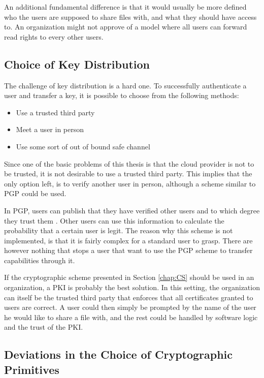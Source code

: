 \documentclass[pdftex,english,10pt,b5paper,twoside]{book}
\begin{document}
An additional fundamental difference is that it would usually be more defined
who the users are supposed to share files with, and what they should have
access to. An organization might not approve of a model where all users can
forward read rights to every other users.

\subsection{Choice of Key Distribution}
\label{sec:DI:keydist}

The challenge of key distribution is a hard one. To successfully authenticate a
user and transfer a key, it is possible to choose from the following methods:

\begin{itemize}
 \item Use a trusted third party
 \item Meet a user in person
 \item Use some sort of out of bound safe channel
\end{itemize}

Since one of the basic problems of this thesis is that the cloud provider is
not to be trusted, it is not desirable to use a trusted third party. This
implies that the only option left, is to verify another user in person,
although a scheme similar to \ac{PGP} could be used. 

In \ac{PGP}, users can publish that they have verified other users and to which
degree they trust them \cite{stallings}. Other users can use this information
to calculate the probability that a certain user is legit. The reason why this
scheme is not implemented, is that it is fairly complex for a standard user to
grasp. There are however nothing that stops a user that want to use the
\ac{PGP} scheme to transfer capabilities through it.

If the cryptographic scheme presented in Section \ref{chap:CS} should be used
in an organization, a \ac{PKI} is probably the best solution. In this setting,
the organization can itself be the trusted third party that enforces that all
certificates granted to users are correct. A user could then simply be prompted
by the name of the user he would like to share a file with, and the rest could
be handled by software logic and the trust of the \ac{PKI}.

\subsection{Deviations in the Choice of Cryptographic Primitives}
\end{document}
